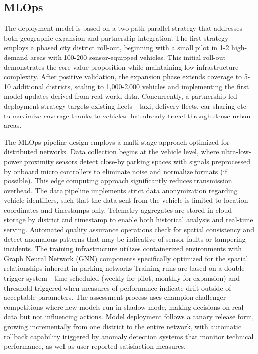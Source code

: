 \subsection{MLOps}

The deployment model is based on a two-path parallel strategy that addresses both geographic expansion and partnership integration. The first strategy employs a phased city district roll-out, beginning with a small pilot in 1-2 high-demand areas with 100-200 sensor-equipped vehicles. This initial roll-out demonstrates the core value proposition while maintaining low infrastructure complexity. After positive validation, the expansion phase extends coverage to 5-10 additional districts, scaling to 1,000-2,000 vehicles and implementing the first model updates derived from real-world data. Concurrently, a partnership-led deployment strategy targets existing fleets—taxi, delivery fleets, car-sharing etc—to maximize coverage thanks to vehicles that already travel through dense urban areas.

The MLOps pipeline design employs a multi-stage approach optimized for distributed networks. Data collection begins at the vehicle level, where ultra-low-power proximity sensors detect close-by parking spaces with signals preprocessed by onboard micro controllers to eliminate noise and normalize formats (if possible). This edge computing approach significantly reduces transmission overhead. The data pipeline implements strict data anonymization regarding vehicle identifiers, such that the data sent from the vehicle is limited to location coordinates and timestamps only. Telemetry aggregates are stored in cloud storage by district and timestamp to enable both historical analysis and real-time serving. Automated quality assurance operations check for spatial consistency and detect anomalous patterns that may be indicative of sensor faults or tampering incidents. The training infrastructure utilizes containerized environments with Graph Neural Network (GNN) components specifically optimized for the spatial relationships inherent in parking networks Training runs are based on a double-trigger system—time-scheduled (weekly for pilot, monthly for expansion) and threshold-triggered when measures of performance indicate drift outside of acceptable parameters. The assessment process uses champion-challenger competitions where new models run in shadow mode, making decisions on real data but not influencing actions. Model deployment follows a canary release form, growing incrementally from one district to the entire network, with automatic rollback capability triggered by anomaly detection systems that monitor technical performance, as well as user-reported satisfaction measures. 

